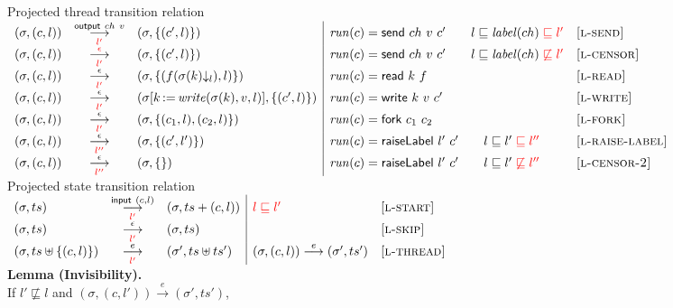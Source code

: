 \documentclass{article}
\makeatletter
\newcommand{\storeupdate}[3]{#1[#2\,{:}{=}\,#3]}
\newcommand{\startrules}{\begin{array}{l@{~{,}~}lcl@{~{,}~}l|ll}}
\newcommand{\finishrules}{\end{array}}
\newcommand{\rn}[1]{\text{\textsc{[#1]}}}
\newcommand{\steprule}[5]{%
      \multicolumn{2}{l}{ #3 }
    &
      {#4}
    &
      \multicolumn{2}{l|}{ #5 }
    &
      #2
    &
      \rn{#1}
  \\%
}
\newcommand{\tsteparrow}[1]{\overset{#1}{\longrightarrow}}
\newcommand{\tstep}[3]{#2\tsteparrow{#1}#3}
\newcommand{\ltsteparrow}[2]{\overset{#2}{\underset{#1}{\longrightarrow}}}
\newcommand{\ltstep}[4]{#3\ltsteparrow{#1}{#2}#4}
\newcommand{\ltsteprule}[6]{\steprule{#1}{#2}{#5}{\ltsteparrow{#3}{#4}}{#6}}
\newcommand{\lssteparrow}[2]{\overset{#2}{\underset{#1}{\longrightarrow}}}
\newcommand{\lsstep}[4]{#3\lssteparrow{#1}{#2}#4}
\newcommand{\lssteprule}[6]{\steprule{#1}{#2}{#5}{\lssteparrow{#3}{#4}}{#6}}
\newcommand{\replace}[3]{\storeupdate{#1}{#2}{#3}}
\newcommand{\upd}[3]{\replace{#1}{#2}{#3}}
\newcommand{\s}[1]{\text{\textit{#1}}}
\newcommand{\thread}[2]{(#1,#2)}
\newcommand{\opread}[2]{\textsf{read}~#1~#2}
\newcommand{\opwrite}[3]{\textsf{write}~#1~#2~#3}
\newcommand{\opsend}[3]{\textsf{send}~#1~#2~#3}
\newcommand{\opfork}[2]{\textsf{fork}~#1~#2}
\newcommand{\opraiselabel}[2]{\textsf{raiseLabel}~#1~#2}
\newcommand{\evstart}[1]{\textsf{input}~#1}
\newcommand{\evsend}[2]{\textsf{output}~#1~#2}
\newcommand{\proj}[2]{#1{\downarrow_{#2}}}
\makeatother
\begin{document}
\newpage
\noindent
%
%
\fbox{$\ltstep{l}{e}{(\sigma,t)}{\Sigma}$} Projected thread transition relation
\\
$\startrules
  \ltsteprule{l-send}
        {\s{run}(c)=\opsend{ch}{v}{c'}\qquad l\sqsubseteq\s{label}(ch){\color{red}{}\sqsubseteq l'}}
        {{\color{red}l'}}
        {\evsend{ch}{v}}
        {(\sigma,\thread{c}{l})}
        {(\sigma,\{\thread{c'}{l}\})}
  \ltsteprule{l-censor}
        {\s{run}(c)=\opsend{ch}{v}{c'}\qquad l\sqsubseteq\s{label}(ch){\color{red}{}\not\sqsubseteq l'}}
        {{\color{red}l'}}
        {{\color{red}\epsilon}}
        {(\sigma,\thread{c}{l})}
        {(\sigma,\{\thread{c'}{l}\})}
  \ltsteprule{l-read}
        {\s{run}(c)=\opread{k}{f}}
        {{\color{red}l'}}
        {\epsilon}
        {(\sigma,\thread{c}{l})}
        {(\sigma,\{\thread{f(\proj{\sigma(k)}{l})}{l}\})}
  \ltsteprule{l-write}
        {\s{run}(c)=\opwrite{k}{v}{c'}}
        {{\color{red}l'}}
        {\epsilon}
        {(\sigma,\thread{c}{l})}
        {(\upd{\sigma}{k}{\s{write}(\sigma(k),v,l)},\{\thread{c'}{l}\})}
  \ltsteprule{l-fork}
        {\s{run}(c) = \opfork{c_1}{c_2}}
        {{\color{red}l'}}
        {\epsilon}
        {(\sigma,\thread{c}{l})}
        {(\sigma,\{\thread{c_1}{l},\thread{c_2}{l}\})}
  \ltsteprule{l-raise-label}
        {\s{run}(c) = \opraiselabel{l'}{c'}\qquad l\sqsubseteq l'{\color{red}{}\sqsubseteq l''}}
        {{\color{red}l''}}
        {\epsilon}
        {(\sigma,\thread{c}{l})}
        {(\sigma,\{\thread{c'}{l'}\})}
  \ltsteprule{l-censor-2}
        {\s{run}(c) = \opraiselabel{l'}{c'}\qquad l\sqsubseteq l'{\color{red}{}\not\sqsubseteq l''}}
        {{\color{red}l''}}
        {\epsilon}
        {(\sigma,\thread{c}{l})}
        {(\sigma,\{\})}
\finishrules$
\\
\fbox{$\lsstep{l}{e}{\Sigma}{\Sigma}$} Projected state transition relation
\\
$\startrules
  \lssteprule{l-start}
        {{\color{red}l\sqsubseteq l'}}
        {{\color{red}l'}}
        {\evstart{\thread{c}{l}}}
        {(\sigma, ts)}
        {(\sigma, ts+\thread{c}{l})}
  \lssteprule{l-skip}
        {}
        {{\color{red}l'}}
        {\epsilon}
        {(\sigma,ts)}
        {(\sigma,ts)}
  \lssteprule{l-thread}
        {\tstep{e}{(\sigma,\thread{c}{l})}{(\sigma',ts')}}
        {{\color{red}l'}}
        {e}
        {(\sigma,ts\uplus\{\thread{c}{l}\})}
        {(\sigma',ts\uplus ts')}
\finishrules$
\\
\textbf{Lemma (Invisibility).}
\\
If $l'\not\sqsubseteq l$
and $\tstep{e}{(\sigma,\thread{c}{l'})}{(\sigma',ts')}$,
\end{document}
